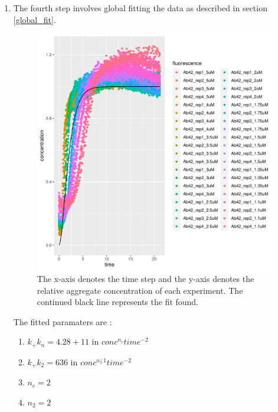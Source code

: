 \documentclass[11pt,a4paper]{article}
\begin{document}
\begin{enumerate}
  \item The fourth step involves global fitting the data as described in section \ref{global_fit}.
  \begin{figure}[H]
  \centering
  \includegraphics[width=1\textwidth]{Images/amylofit.pdf}
  \caption{The x-axis denotes the time step and the y-axis denotes the relative aggregate concentration of each experiment. The continued black line represents the fit found.}
  \label{fig: sample trajectory}
  \end{figure}
  The fitted paramaters are :
  \begin{enumerate}
    \item $k_{+}k_{n} = 4.28+11$ in $conc^{n_c} time^{-2}$
    \item $k_{+}k_{2} = 636$ in $conc^{n_{2}^-1} time^{-2}$
    \item $n_c = 2$
    \item $n_2 = 2$
  \end{enumerate}


\end{enumerate}
\end{document}
